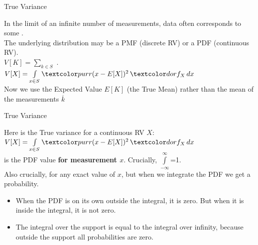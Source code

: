 \documentclass[10pt,sans,english,compress,xcolor=dvipsnames]{beamer}
\begin{document}
\begin{frame}{True Variance}
\footnotesize

In the limit of an infinite number of measurements, data often corresponds to some .\\[1ex]

 The underlying distribution may be a PMF (discrete RV) or a PDF (continuous RV).\\[1ex]

$V[K] = \sum\limits_{k \in S}$   .\\[1ex]


$V[X] = \int\limits_{x \in S} \purp{ (x - E[X])^2}\, \dor{f_X}\, dx$  \\[1ex]

Now we use the Expected Value $E[K]$ (the True Mean) rather than the mean of the measurements $\overline{k}$

\end{frame} 


\begin{frame}{True Variance}
\footnotesize

Here is the True variance for a continuous RV $X$:\\[1ex]

$V[X] = \int\limits_{x \in S} \purp{ (x - E[X])^2}\, \dor{f_X}\, dx$ \\[1ex]

 is the PDF value \textbf{for measurement $x$}. Crucially, $\int\limits_{-\infty}^{\infty}$=1. \\[1ex]

Also crucially,  for any exact value of $x$, but when we integrate the PDF we get a probability.

\begin{itemize}
\item When the PDF is on its own outside the integral, it is zero. But when it is inside the integral, it is not zero.
\item The integral over the support is equal to the integral over infinity, because outside the support all probabilities are zero.
\end{itemize}
\end{frame} 

%
%
%
%
%
%
%
\end{document}
